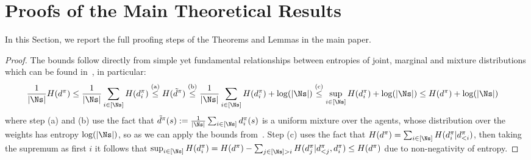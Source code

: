 \section{Proofs of the Main Theoretical Results}
\label{apx:proof}

In this Section, we report the full proofing steps of the Theorems and Lemmas in the main paper.

\entropymismatch*

\begin{proof}
    The bounds follow directly from simple yet fundamental relationships between entropies of joint, marginal and mixture distributions which can be found in~\citet{ paninski2003, Kolchinsky_2017}, in particular:
    \begin{align*}
        &\frac{1}{|\Ns|}H(d^\pi) \leq \frac{1}{|\Ns|}\sum_{i \in [\Ns]}H(d_i^\pi)  \overset{\text{(a)}}{\leq} H(\tilde d^\pi)  \overset{\text{(b)}}{\leq} \frac{1}{|\Ns|}\sum_{i \in [\Ns]}H(d_i^\pi)+ \log(|\Ns|)  \overset{\text{(c)}}{\leq} \sup_{i \in [\Ns]}H(d_i^\pi)+ \log(|\Ns|) \leq H(d^\pi) + \log(|\Ns|)
    \end{align*}
    where step (a) and (b) use the fact that $\tilde d^\pi(s) := \frac{1}{|\Ns|}\sum_{i \in [\Ns]} d^\pi_i(s)$ is a uniform mixture over the agents, whose distribution over the weights has entropy $\log(|\Ns|)$, so as we can apply the bounds from~\citet{Kolchinsky_2017}. Step (c) uses the fact that $H(d^\pi) = \sum_{i \in [\Ns]}H(d^\pi_i|d^\pi_{<i})$, then taking the supremum as first $i$ it follows that $ \sup_{i \in [\Ns]}H(d_i^\pi) = H(d^\pi) - \sum_{j \in [\Ns]> i} H(d^\pi_j|d^\pi_{<j}, d^\pi_{i}) \leq H(d^\pi)$ due to non-negativity of entropy.
\end{proof}

\objectivemismatch*

